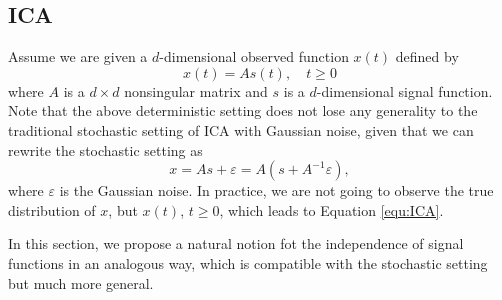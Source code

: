 \documentclass[twoside]{article}
\theoremstyle{definition}
\newcommand{\eps}{\varepsilon}
\begin{document}
\subsection{ICA}
\label{subsec:ICA}
Assume we are given a $d$-dimensional observed function $x(t)$ defined by  
\begin{equation}
\label{equ:ICA}
x(t) = As(t), \quad t\ge0
\end{equation}
where $A$ is a $d\times d$ nonsingular matrix and  $s$ is a $d$-dimensional signal function. 
Note that the above deterministic setting does not lose any generality to the traditional stochastic setting of ICA with Gaussian noise, given that we can rewrite the stochastic setting as 
\[
x = As+\eps = A(s+A^{-1}\eps),
\] 
where $\eps$ is the Gaussian noise. In practice, we are not going to observe the true distribution of $x$, but $x(t)$, $t\ge 0$, which leads to Equation \eqref{equ:ICA}.



In this section, we propose a natural notion fot the independence of signal functions in an analogous way, which is compatible with the stochastic setting but much more general.
\end{document}
